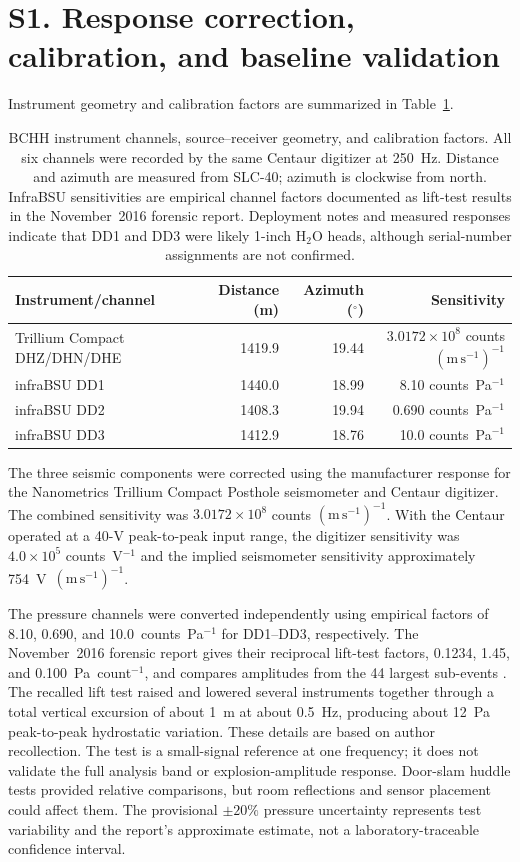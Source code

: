 \documentclass[]{seismica}
\begin{document}
\section*{S1. Response correction, calibration, and baseline validation}
\label{sec:supp_response}

Instrument geometry and calibration factors are summarized in
Table~\ref{tab:instrument_calibration}.

\begin{table}[!b]
\centering
\caption{BCHH instrument channels, source--receiver geometry, and
calibration factors. All six channels were recorded by the same Centaur
digitizer at 250~Hz. Distance and azimuth are measured from SLC-40; azimuth is
clockwise from north. InfraBSU sensitivities are empirical channel factors documented as lift-test
results in the November~2016 forensic report. Deployment notes and measured
responses indicate that DD1 and DD3 were likely 1-inch H$_2$O heads, although
serial-number assignments are not confirmed.}
\label{tab:instrument_calibration}
\begin{tabular}{lrrr}
\hline
Instrument/channel & Distance (m) & Azimuth ($^\circ$) & Sensitivity \\
\hline
Trillium Compact DHZ/DHN/DHE & 1419.9 & 19.44
  & $3.0172\times10^8$ counts $(\mathrm{m\,s^{-1}})^{-1}$ \\
infraBSU DD1 & 1440.0 & 18.99 & 8.10 counts~Pa$^{-1}$ \\
infraBSU DD2 & 1408.3 & 19.94 & 0.690 counts~Pa$^{-1}$ \\
infraBSU DD3 & 1412.9 & 18.76 & 10.0 counts~Pa$^{-1}$ \\
\hline
\end{tabular}
\end{table}

The three seismic components were corrected using the manufacturer response
for the Nanometrics Trillium Compact Posthole seismometer and Centaur digitizer.
The combined sensitivity was $3.0172\times10^8$ counts
$(\mathrm{m\,s^{-1}})^{-1}$. With the Centaur operated at a 40-V peak-to-peak
input range, the digitizer sensitivity was $4.0\times10^5$ counts~V$^{-1}$ and
the implied seismometer sensitivity approximately
754~V~$(\mathrm{m\,s^{-1}})^{-1}$.

The pressure channels were converted independently using empirical factors of
8.10, 0.690, and 10.0~counts~Pa$^{-1}$ for DD1--DD3, respectively. The
November~2016 forensic report gives their reciprocal lift-test factors, 0.1234,
1.45, and 0.100~Pa~count$^{-1}$, and compares amplitudes from the 44 largest
sub-events \citep{thompson_mcnutt_fireball_2016}. The recalled lift test raised
and lowered several instruments together through a total vertical excursion of
about 1~m at about 0.5~Hz, producing about 12~Pa peak-to-peak hydrostatic
variation. These details are based on author recollection. The test is a
small-signal reference at one frequency; it does not validate the full analysis
band or explosion-amplitude response. Door-slam huddle tests provided relative
comparisons, but room reflections and sensor placement could affect them. The
provisional $\pm20\%$ pressure uncertainty represents test variability and the
report's approximate estimate, not a laboratory-traceable confidence interval.
\end{document}

